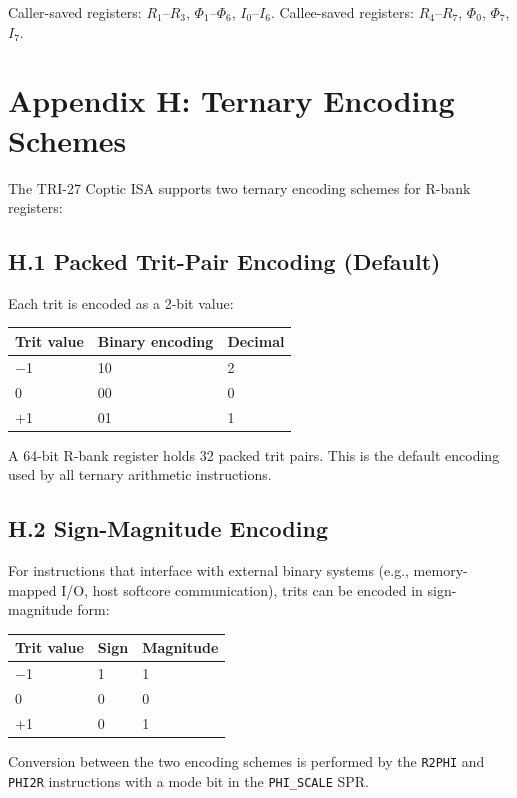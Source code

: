Caller-saved registers: \(R_1\)--\(R_3\), \(\Phi_1\)--\(\Phi_6\),
\(I_0\)--\(I_6\). Callee-saved registers: \(R_4\)--\(R_7\),
\(\Phi_0\), \(\Phi_7\), \(I_7\).

\section{Appendix H: Ternary Encoding Schemes}\label{fa_71:appx-ternary-encoding}

The TRI-27 Coptic ISA supports two ternary encoding schemes for
R-bank registers:

\subsection{H.1 Packed Trit-Pair Encoding (Default)}

Each trit is encoded as a 2-bit value:

\begin{longtable}[]{@{}lll@{}}
\toprule\noalign{}
Trit value & Binary encoding & Decimal \\
\midrule\noalign{}
\endhead
\bottomrule\noalign{}
\endlastfoot
$-$1 & 10 & 2 \\
0 & 00 & 0 \\
$+$1 & 01 & 1 \\
\end{longtable}

A 64-bit R-bank register holds 32 packed trit pairs. This is the
default encoding used by all ternary arithmetic instructions.

\subsection{H.2 Sign-Magnitude Encoding}

For instructions that interface with external binary systems
(e.g., memory-mapped I/O, host softcore communication), trits
can be encoded in sign-magnitude form:

\begin{longtable}[]{@{}lll@{}}
\toprule\noalign{}
Trit value & Sign & Magnitude \\
\midrule\noalign{}
\endhead
\bottomrule\noalign{}
\endlastfoot
$-$1 & 1 & 1 \\
0 & 0 & 0 \\
$+$1 & 0 & 1 \\
\end{longtable}

Conversion between the two encoding schemes is performed by the
\texttt{R2PHI} and \texttt{PHI2R} instructions with a mode bit
in the \texttt{PHI\_SCALE} SPR.

